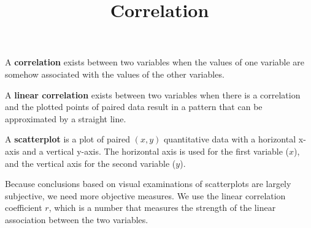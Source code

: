 \documentclass{beamer}
\title[MA205 - Section 10.1]{Correlation}
\begin{document}
\begin{frame}
\titlepage
\end{frame}

\begin{frame}\small
\begin{definition}
A \textbf{correlation} exists between two variables when the values of one variable are somehow associated with the values of the other variables.
\end{definition}\pause

\begin{definition}
A \textbf{linear correlation} exists between two variables when there is a correlation and the plotted points of paired data result in a pattern that can be approximated by a straight line.
\end{definition}\pause

\begin{definition}
A \textbf{scatterplot} is a plot of paired $(x,y)$ quantitative data with a horizontal x-axis and a vertical y-axis. The horizontal axis is used for the first variable ($x$), and the vertical axis for the second variable ($y$).
\end{definition}\pause

\begin{note}
Because conclusions based on visual examinations of scatterplots are largely subjective, we need more objective measures. We use the linear correlation coefficient $r$, which is a number that measures the strength of the linear association between the two variables.
\end{note}
\end{frame}
\end{document}
